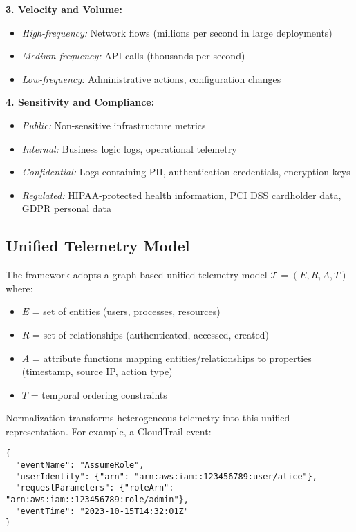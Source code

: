 \textbf{3. Velocity and Volume:}
\begin{itemize}
    \item \emph{High-frequency:} Network flows (millions per second in large deployments)
    \item \emph{Medium-frequency:} API calls (thousands per second)
    \item \emph{Low-frequency:} Administrative actions, configuration changes
\end{itemize}

\textbf{4. Sensitivity and Compliance:}
\begin{itemize}
    \item \emph{Public:} Non-sensitive infrastructure metrics
    \item \emph{Internal:} Business logic logs, operational telemetry
    \item \emph{Confidential:} Logs containing PII, authentication credentials, encryption keys
    \item \emph{Regulated:} HIPAA-protected health information, PCI DSS cardholder data, GDPR personal data
\end{itemize}

\subsection{Unified Telemetry Model}
The framework adopts a graph-based unified telemetry model $\mathcal{T} = (E, R, A, T)$ where:
\begin{itemize}
    \item $E$ = set of entities (users, processes, resources)
    \item $R$ = set of relationships (authenticated, accessed, created)
    \item $A$ = attribute functions mapping entities/relationships to properties (timestamp, source IP, action type)
    \item $T$ = temporal ordering constraints
\end{itemize}

Normalization transforms heterogeneous telemetry into this unified representation. For example, a CloudTrail event:
\begin{verbatim}
{
  "eventName": "AssumeRole",
  "userIdentity": {"arn": "arn:aws:iam::123456789:user/alice"},
  "requestParameters": {"roleArn": "arn:aws:iam::123456789:role/admin"},
  "eventTime": "2023-10-15T14:32:01Z"
}
\end{verbatim}

